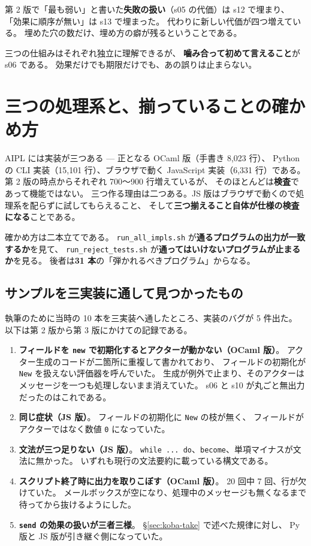 \documentclass[11pt,a4paper]{ltjsarticle}
\theoremstyle{definition}
\theoremstyle{remark}
\begin{document}
第 2 版で「最も弱い」と書いた\textbf{失敗の扱い}（s05 の代価）は s12 で埋まり、
「効果に順序が無い」は s13 で埋まった。
代わりに新しい代価が四つ増えている。
埋めた穴の数だけ、埋め方の癖が残るということである。

三つの仕組みはそれぞれ独立に理解できるが、
\textbf{噛み合って初めて言えること}が s06 である。
効果だけでも期限だけでも、あの誤りは止まらない。

\section{三つの処理系と、揃っていることの確かめ方}
\label{sec:impl}

AIPL には実装が三つある --- 正となる OCaml 版（手書き 8,023 行）、
Python の CLI 実装（15,101 行）、ブラウザで動く JavaScript 実装（6,331 行）である。
第 2 版の時点からそれぞれ 700〜900 行増えているが、
そのほとんどは\textbf{検査}であって機能ではない。
三つ作る理由は二つある。JS 版はブラウザで動くので処理系を配らずに試してもらえること、
そして\textbf{三つ揃えること自体が仕様の検査になる}ことである。

確かめ方は二本立てである。
\texttt{run\_all\_impls.sh} が\textbf{通るプログラムの出力が一致するか}を見て、
\texttt{run\_reject\_tests.sh} が\textbf{通ってはいけないプログラムが止まるか}を見る。
後者は\textbf{31 本}の「弾かれるべきプログラム」からなる。

\subsection{サンプルを三実装に通して見つかったもの}

執筆のために当時の 10 本を三実装へ通したところ、実装のバグが 5 件出た。
以下は第 2 版から第 3 版にかけての記録である。

\begin{enumerate}
\item \textbf{フィールドを \texttt{new} で初期化するとアクターが動かない（OCaml 版）}。
      アクター生成のコードが二箇所に重複して書かれており、
      フィールドの初期化が \texttt{New} を扱えない評価器を呼んでいた。
      生成が例外で止まり、そのアクターはメッセージを一つも処理しないまま消えていた。
      s06 と s10 が丸ごと無出力だったのはこれである。
\item \textbf{同じ症状（JS 版）}。
      フィールドの初期化に \texttt{New} の枝が無く、
      フィールドがアクターではなく数値 \texttt{0} になっていた。
\item \textbf{文法が三つ足りない（JS 版）}。
      \texttt{while ... do}、\texttt{become}、単項マイナスが文法に無かった。
      いずれも現行の文法要約に載っている構文である。
\item \textbf{スクリプト終了時に出力を取りこぼす（OCaml 版）}。
      20 回中 7 回、行が欠けていた。
      メールボックスが空になり、処理中のメッセージも無くなるまで待ってから抜けるようにした。
\item \textbf{\texttt{send} の効果の扱いが三者三様}。
      \S\ref{sec:koba-take} で述べた規律に対し、
      Py 版と JS 版が引き継ぐ側になっていた。
\end{enumerate}
\end{document}
